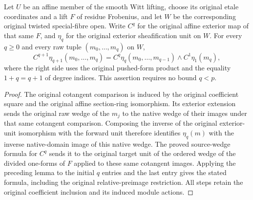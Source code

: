 \begin{lemma}
\label{lem:di-higher-exterior-witt-unit-product}
\leanok
{}
Let $U$ be an affine member of the smooth Witt lifting, choose its original
etale coordinates and a lift $F$ of residue Frobenius, and let $W$ be the
corresponding original twisted special-fibre open. Write $C^q$ for the
original affine exterior map of that same $F$, and $\eta_q$ for the
original exterior sheafification unit on $W$. For every $q\geq0$ and every
raw tuple $(m_0,\ldots,m_q)$ on $W$,
\[
 C^{q+1}\eta_{q+1}(m_0,\ldots,m_q)
 =C^q\eta_q(m_0,\ldots,m_{q-1})\wedge C^1\eta_1(m_q),
\]
where the right side uses the original pushed-form product and the equality
$1+q=q+1$ of degree indices. This assertion requires no bound $q<p$.
\end{lemma}
\begin{proof}
\leanok
The original cotangent comparison is induced by the original coefficient
square and the original affine section-ring isomorphism. Its exterior
extension sends the original raw wedge of the $m_j$ to the native wedge
of their images under that same cotangent comparison. Composing the inverse
of the original exterior-unit isomorphism with the forward unit therefore
identifies $\eta_q(m)$ with the inverse native-domain image of this native
wedge. The proved source-wedge formula for $C^q$ sends it to the original
target unit of the ordered wedge of the divided one-forms of $F$ applied
to these same cotangent images. Applying the preceding lemma to the initial
$q$ entries and the last entry gives the stated formula, including the
original relative-preimage restriction. All steps retain the original
coefficient inclusion and its induced module actions.
\end{proof}

